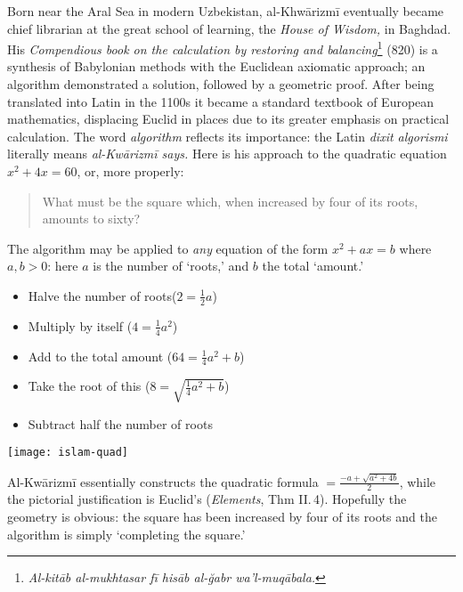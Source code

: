 	
Born near the Aral Sea in modern Uzbekistan, al-Khwārizmī eventually became chief librarian at the great school of learning, the \emph{House of Wisdom,} in Baghdad. His \emph{Compendious book on the calculation by restoring and balancing}\footnote{\emph{Al-kitāb al-mukhtasar fī hisāb al-ğabr wa’l-muqābala.}} (820) is a synthesis of Babylonian methods with the Euclidean axiomatic approach; an algorithm demonstrated a solution, followed by a geometric proof. After being translated into Latin in the 1100s it became a standard textbook of European mathematics, displacing Euclid in places due to its greater emphasis on practical calculation. The word \emph{algorithm} reflects its importance: the Latin \emph{dixit algorismi} literally means \emph{al-Kwārizmī says.} Here is his approach to the quadratic equation $x^2+4x=60$, or, more properly:
\begin{quote}
	What must be the square which, when increased by four of its roots, amounts to sixty?
\end{quote}


\begin{minipage}[t]{0.7\linewidth}\vspace{-4pt}
	The algorithm may be applied to \emph{any} equation of the form $x^2+ax=b$ where $a,b>0$: here $a$ is the number of `roots,' and $b$ the total `amount.'
	\begin{itemize}\itemsep0pt
	  \item Halve the number of roots\hfill \big($2=\frac 12a$\big)
	  \item Multiply by itself \hfill \big($4=\frac 14a^2$\big)
	  \item Add to the total amount \hfill \big($64=\frac 14a^2+b$\big)
	  \item Take the root of this \hfill \Big($8=\sqrt{\frac 14a^2+b}$\Big)
	  \item Subtract half the number of roots \hfill {}
	\end{itemize}
\end{minipage}
\hfill
\begin{minipage}[t]{0.29\linewidth}\vspace{-3pt}
	\flushright
	\texttt{[image: islam-quad]}
\end{minipage}
\smallbreak
Al-Kwārizmī essentially constructs the quadratic formula $=\frac{-a+\sqrt{a^2+4b}}2$, while the pictorial justification is Euclid's (\emph{Elements}, Thm II.\,4). Hopefully the geometry is obvious: the square has been increased by four of its roots and the algorithm is simply `completing the square.'
\goodbreak

